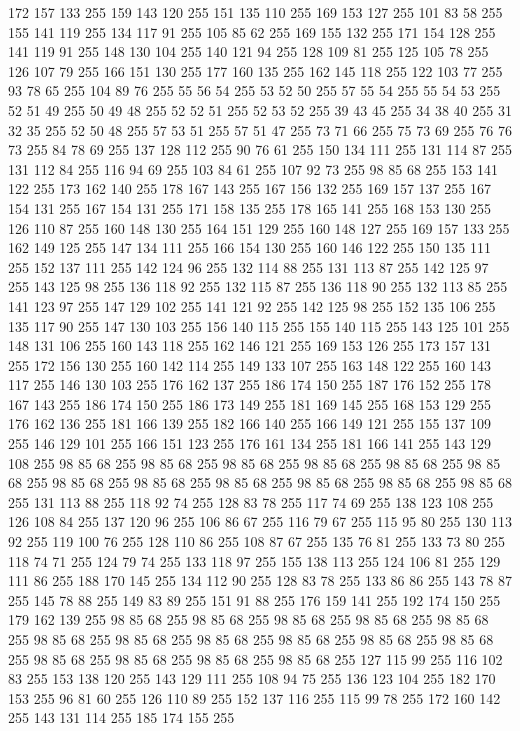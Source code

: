 172 157 133 255 159 143 120 255 151 135 110 255 169 153 127 255 101 83 58 255 155 141 119 255 134 117 91 255 105 85 62 255 169 155 132 255 171 154 128 255 141 119 91 255 148 130 104 255 140 121 94 255 128 109 81 255 125 105 78 255 126 107 79 255 166 151 130 255 177 160 135 255 162 145 118 255 122 103 77 255 93 78 65 255 104 89 76 255 55 56 54 255 53 52 50 255 57 55 54 255 55 54 53 255 52 51 49 255 50 49 48 255 52 52 51 255 52 53 52 255 39 43 45 255 34 38 40 255 31 32 35 255 52 50 48 255 57 53 51 255 57 51 47 255 73 71 66 255 75 73 69 255 76 76 73 255 84 78 69 255 137 128 112 255 90 76 61 255 150 134 111 255 131 114 87 255 131 112 84 255 116 94 69 255 103 84 61 255 107 92 73 255 98 85 68 255 153 141 122 255 173 162 140 255 178 167 143 255 167 156 132 255 169 157 137 255 167 154 131 255 167 154 131 255 171 158 135 255 178 165 141 255 168 153 130 255 126 110 87 255 160 148 130 255 164 151 129 255 160 148 127 255 169 157 133 255
162 149 125 255 147 134 111 255 166 154 130 255 160 146 122 255 150 135 111 255 152 137 111 255 142 124 96 255 132 114 88 255 131 113 87 255 142 125 97 255 143 125 98 255 136 118 92 255 132 115 87 255 136 118 90 255 132 113 85 255 141 123 97 255 147 129 102 255 141 121 92 255 142 125 98 255 152 135 106 255 135 117 90 255 147 130 103 255 156 140 115 255 155 140 115 255 143 125 101 255 148 131 106 255 160 143 118 255 162 146 121 255 169 153 126 255 173 157 131 255 172 156 130 255 160 142 114 255 149 133 107 255 163 148 122 255 160 143 117 255 146 130 103 255 176 162 137 255 186 174 150 255 187 176 152 255 178 167 143 255 186 174 150 255 186 173 149 255 181 169 145 255 168 153 129 255 176 162 136 255 181 166 139 255 182 166 140 255 166 149 121 255 155 137 109 255 146 129 101 255 166 151 123 255 176 161 134 255 181 166 141 255 143 129 108 255 98 85 68 255 98 85 68 255 98 85 68 255 98 85 68 255 98 85 68 255 98 85 68 255 98 85 68 255 98 85 68 255 98 85 68 255 98 85 68 255
98 85 68 255 98 85 68 255 131 113 88 255 118 92 74 255 128 83 78 255 117 74 69 255 138 123 108 255 126 108 84 255 137 120 96 255 106 86 67 255 116 79 67 255 115 95 80 255 130 113 92 255 119 100 76 255 128 110 86 255 108 87 67 255 135 76 81 255 133 73 80 255 118 74 71 255 124 79 74 255 133 118 97 255 155 138 113 255 124 106 81 255 129 111 86 255 188 170 145 255 134 112 90 255 128 83 78 255 133 86 86 255 143 78 87 255 145 78 88 255 149 83 89 255 151 91 88 255 176 159 141 255 192 174 150 255 179 162 139 255 98 85 68 255 98 85 68 255 98 85 68 255 98 85 68 255 98 85 68 255 98 85 68 255 98 85 68 255 98 85 68 255 98 85 68 255 98 85 68 255 98 85 68 255 98 85 68 255 98 85 68 255 98 85 68 255 98 85 68 255 127 115 99 255 116 102 83 255 153 138 120 255 143 129 111 255 108 94 75 255 136 123 104 255 182 170 153 255 96 81 60 255 126 110 89 255 152 137 116 255 115 99 78 255 172 160 142 255 143 131 114 255 185 174 155 255
